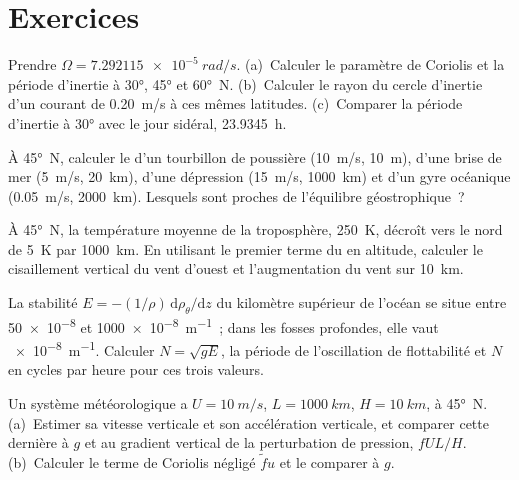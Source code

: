 \section{Exercices}

\begin{exercise}[$\star$]\label{exo:b3:gfd-foundations:1}
Prendre $\Omega = \qty{7.292115e-5}{rad/s}$. (a)~Calculer le paramètre de Coriolis et la
période d'inertie à \ang{30}, \ang{45} et \ang{60}~N.
(b)~Calculer le rayon du cercle d'inertie d'un courant de
\qty{0.20}{m/s} à ces mêmes latitudes. (c)~Comparer la période d'inertie à
\ang{30} avec le jour sidéral, \qty{23.9345}{h}.
\end{exercise}

\begin{exercise}[$\star$]\label{exo:b3:gfd-foundations:2}
À \ang{45}~N, calculer le  d'un tourbillon de poussière (\qty{10}{m/s},
\qty{10}{m}), d'une brise de mer (\qty{5}{m/s}, \qty{20}{km}), d'une dépression
(\qty{15}{m/s}, \qty{1000}{km}) et d'un gyre océanique (\qty{0.05}{m/s},
\qty{2000}{km}). Lesquels sont proches de l'équilibre géostrophique~?
\end{exercise}

\begin{exercise}[$\star$]\label{exo:b3:gfd-foundations:3}
À \ang{45}~N, la température moyenne de la troposphère, \qty{250}{K}, décroît vers
le nord de \qty{5}{K} par \qty{1000}{km}. En utilisant le premier terme
du  en altitude, calculer le cisaillement vertical du vent d'ouest et
l'augmentation du vent sur \qty{10}{km}.
\end{exercise}

\begin{exercise}[$\star$]\label{exo:b3:gfd-foundations:4}
La stabilité $E = -(1/\rho)\,\mathrm d\rho_\theta/\mathrm dz$ du kilomètre supérieur
de l'océan se situe entre \num{50e-8} et \qty{1000e-8}{m^{-1}}~;
dans les fosses profondes, elle vaut \qty{e-8}{m^{-1}}. Calculer $N = \sqrt{gE}$, la
période de l'oscillation de flottabilité et $N$ en cycles par heure pour ces
trois valeurs.
\end{exercise}

\begin{exercise}[$\star\star$]\label{exo:b3:gfd-foundations:5}
Un système météorologique a $U = \qty{10}{m/s}$, $L = \qty{1000}{km}$, $H =
\qty{10}{km}$, à \ang{45}~N. (a)~Estimer sa vitesse verticale et son
accélération verticale, et comparer cette dernière à $g$ et au
gradient vertical de la perturbation de pression, $fUL/H$. (b)~Calculer le
terme de Coriolis négligé $\tilde fu$ et le comparer à $g$.
\end{exercise}

